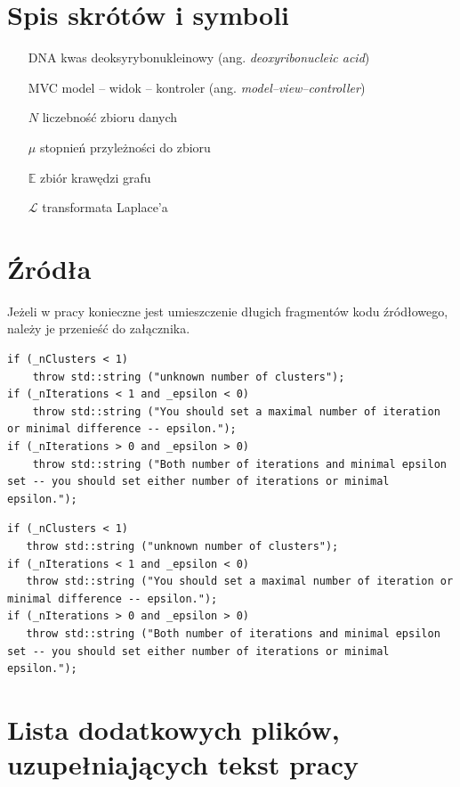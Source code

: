 \documentclass[a4paper,twoside,12pt]{book}
\newcommand{\obcy}[1]{\emph{#1}}
\newcommand{\ang}[1]{{\selectlanguage{british}\obcy{#1}}}
\begin{document}
\begin{appendices}
 

\chapter{Spis skrótów i symboli}

\begin{itemize}
\item[DNA] kwas deoksyrybonukleinowy (ang. \ang{deoxyribonucleic acid})
\item[MVC] model -- widok -- kontroler (ang. \ang{model--view--controller}) 
\item[$N$] liczebność zbioru danych
\item[$\mu$] stopnień przyleżności do zbioru
\item[$\mathbb{E}$] zbiór krawędzi grafu
\item[$\mathcal{L}$] transformata Laplace'a 
\end{itemize}


\chapter{Źródła}

Jeżeli w pracy konieczne jest umieszczenie długich fragmentów kodu źródłowego, należy je przenieść do załącznika.

\begin{lstlisting}
if (_nClusters < 1)
	throw std::string ("unknown number of clusters");
if (_nIterations < 1 and _epsilon < 0)
	throw std::string ("You should set a maximal number of iteration or minimal difference -- epsilon.");
if (_nIterations > 0 and _epsilon > 0)
	throw std::string ("Both number of iterations and minimal epsilon set -- you should set either number of iterations or minimal epsilon.");
\end{lstlisting}


\begin{verbatim}
if (_nClusters < 1)
   throw std::string ("unknown number of clusters");
if (_nIterations < 1 and _epsilon < 0)
   throw std::string ("You should set a maximal number of iteration or minimal difference -- epsilon.");
if (_nIterations > 0 and _epsilon > 0)
   throw std::string ("Both number of iterations and minimal epsilon set -- you should set either number of iterations or minimal epsilon.");
\end{verbatim}
 

\chapter{Lista dodatkowych plików, uzupełniających tekst pracy} 



\end{appendices}
\end{document}
